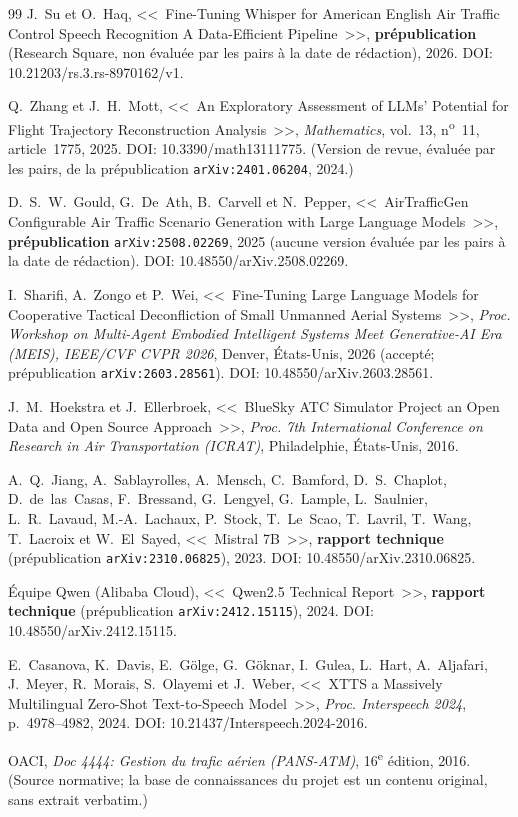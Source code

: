 \documentclass[11pt,a4paper]{article}
\newcommand{\dpt}{\char58\relax}
\begin{document}
\begin{thebibliography}{99}
 J.~Su et O.~Haq, <<~Fine-Tuning Whisper for American English Air
Traffic Control Speech Recognition\dpt{} A Data-Efficient Pipeline~>>, \textbf{prépublication}
(Research Square, non évaluée par les pairs à la date de rédaction), 2026.
DOI: 10.21203/rs.3.rs-8970162/v1.

 Q.~Zhang et J.~H.~Mott, <<~An Exploratory Assessment of LLMs'
Potential for Flight Trajectory Reconstruction Analysis~>>, \emph{Mathematics},
vol.~13, n\textsuperscript{o}~11, article~1775, 2025. DOI: 10.3390/math13111775.
(Version de revue, évaluée par les pairs, de la prépublication \texttt{arXiv:2401.06204}, 2024.)

 D.~S.~W.~Gould, G.~De~Ath, B.~Carvell et N.~Pepper,
<<~AirTrafficGen\dpt{} Configurable Air Traffic Scenario Generation with Large Language
Models~>>, \textbf{prépublication} \texttt{arXiv:2508.02269}, 2025 (aucune version évaluée par
les pairs à la date de rédaction). DOI: 10.48550/arXiv.2508.02269.

 I.~Sharifi, A.~Zongo et P.~Wei, <<~Fine-Tuning Large Language
Models for Cooperative Tactical Deconfliction of Small Unmanned Aerial Systems~>>,
\emph{Proc. Workshop on Multi-Agent Embodied Intelligent Systems Meet Generative-AI
Era (MEIS), IEEE/CVF CVPR 2026}, Denver, États-Unis, 2026 (accepté; prépublication
\texttt{arXiv:2603.28561}). DOI: 10.48550/arXiv.2603.28561.

 J.~M.~Hoekstra et J.~Ellerbroek, <<~BlueSky ATC Simulator Project\dpt{}
an Open Data and Open Source Approach~>>, \emph{Proc. 7th International Conference on
Research in Air Transportation (ICRAT)}, Philadelphie, États-Unis, 2016.

 A.~Q.~Jiang, A.~Sablayrolles, A.~Mensch, C.~Bamford,
D.~S.~Chaplot, D.~de~las~Casas, F.~Bressand, G.~Lengyel, G.~Lample, L.~Saulnier,
L.~R.~Lavaud, M.-A.~Lachaux, P.~Stock, T.~Le~Scao, T.~Lavril, T.~Wang, T.~Lacroix et
W.~El~Sayed, <<~Mistral 7B~>>, \textbf{rapport technique} (prépublication
\texttt{arXiv:2310.06825}), 2023. DOI: 10.48550/arXiv.2310.06825.

 Équipe Qwen (Alibaba Cloud), <<~Qwen2.5 Technical Report~>>,
\textbf{rapport technique} (prépublication \texttt{arXiv:2412.15115}), 2024.
DOI: 10.48550/arXiv.2412.15115.

 E.~Casanova, K.~Davis, E.~Gölge, G.~Göknar, I.~Gulea, L.~Hart,
A.~Aljafari, J.~Meyer, R.~Morais, S.~Olayemi et J.~Weber, <<~XTTS\dpt{} a Massively
Multilingual Zero-Shot Text-to-Speech Model~>>, \emph{Proc. Interspeech 2024},
p.~4978--4982, 2024. DOI: 10.21437/Interspeech.2024-2016.

 OACI, \emph{Doc 4444: Gestion du trafic aérien (PANS-ATM)},
16\textsuperscript{e} édition, 2016. (Source normative; la base de connaissances du
projet est un contenu original, sans extrait verbatim.)

\end{thebibliography}
\endgroup

\clearpage
\appendix

\end{document}
